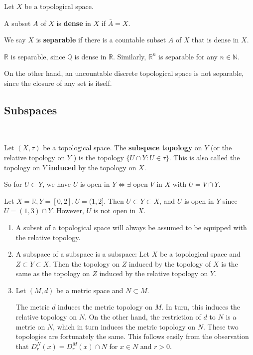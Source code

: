 \documentclass[a4paper,11pt]{article}
\begin{document}
\begin{definition}
    Let $X$ be a topological space.

A subset $A$ of $X$ is \textbf{dense} in $X$ if $\bar{A}=X$.

We say $X$ is \textbf{separable} if there is a countable subset $A$ of $X$ that is dense in $X$.
\end{definition}

\begin{example}
    $\mathbb{R}$ is separable, since $\mathbb{Q}$ is dense in $\mathbb{R}$. Similarly, $\mathbb{R}^{n}$ is separable for any $n \in \mathbb{N}$.

On the other hand, an uncountable discrete topological space is not separable, since the closure of any set is itself.
\end{example}

\subsection{Subspaces}\ \vspace{-1.5em}
\begin{definition}
    Let $(X,\tau)$ be a topological space. The \textbf{subspace topology} on $Y$ (or the relative topology on $Y$ ) is the topology $\{U \cap Y: U \in \tau\}$. This is also called the topology on $Y$ \textbf{induced} by the topology on $X$.

    So for $U \subset Y$, we have $U$ is open in $Y \Longleftrightarrow \exists$ open $V$ in $X$ with $U=V \cap Y$.
\end{definition}

\begin{example}
    Let $ X = \mathbb{R}, Y = [0,2], U = (1,2] $. Then $ U \subset Y \subset X $, and $U$ is open in $Y$ since $U = (1,3)\cap Y$. However, $U$ is not open in $X$. 
\end{example}

\begin{remark}
    \begin{enumerate}
        \item A subset of a topological space will always be assumed to be equipped with the relative topology.
      
        \item A subspace of a subspace is a subspace: Let $X$ be a topological space and $Z \subset Y \subset X$. Then the topology on $Z$ induced by the topology of $X$ is the same as the topology on $Z$ induced by the relative topology on $Y$.
        
        \item Let $(M, d)$ be a metric space and $N \subset M$.
        
        The metric $d$ induces the metric topology on $M$. In turn, this induces the relative topology on $N$. On the other hand, the restriction of $d$ to $N$ is a metric on $N$, which in turn induces the metric topology on $N$. These two topologies are fortunately the same. This follows easily from the observation that $D_{r}^{N}(x)=D_{r}^{M}(x) \cap N$ for $x \in N$ and $r>0$.
      \end{enumerate}
\end{remark}
\end{document}
